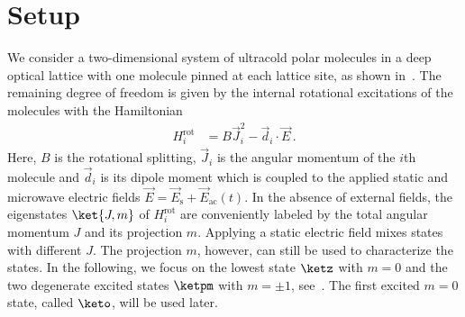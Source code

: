 
\section{Setup}


We consider a two-dimensional system of ultracold polar molecules in a deep optical lattice with one molecule pinned at each lattice site, as shown in~.
The remaining degree of freedom is given by the internal rotational excitations of the molecules with the Hamiltonian
\begin{align}
    H^{\text{rot}}_i &= B \vec{J}_i^2 - \vec{d}_i\cdot\vec{E}\,.
\end{align}
Here, $B$ is the rotational splitting, $\vec{J}_i$ is the angular momentum of the $i$th molecule and $\vec{d}_i$ is its dipole moment which is coupled to the applied static and microwave electric fields $\vec{E} = \vec{E}_{\text{s}} + \vec{E}_{\text{ac}}(t)$.
In the absence of external fields, the eigenstates $\ket{J,m}$ of $H^{\text{rot}}_{i}$ are conveniently labeled by the total angular momentum $J$ and its projection $m$.
Applying a static electric field mixes states with different $J$.
The projection $m$, however, can still be used to characterize the states.
In the following, we focus on the lowest state $\ketz$ with $m=0$ and the two degenerate excited states $\ketpm$ with $m = \pm 1$, see~.
The first excited $m=0$ state, called $\keto$, will be used later.

